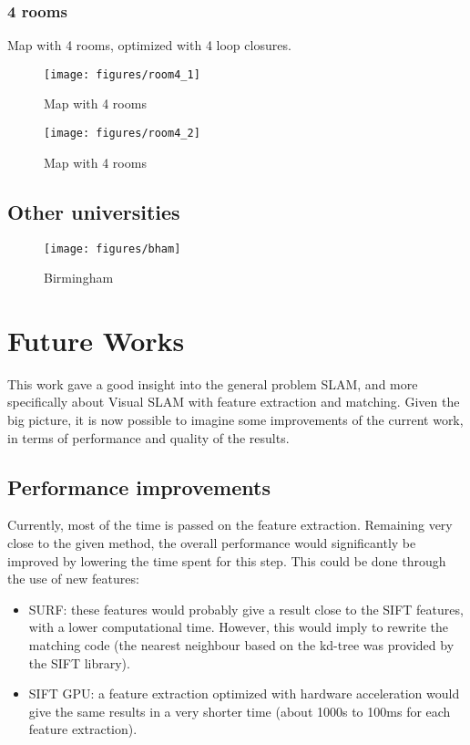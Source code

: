 \clearpage

\subsection{4 rooms}
Map with 4 rooms, optimized with 4 loop closures.

\begin{figure}[h!]
\centering
\texttt{[image: figures/room4\_1]}
\caption{Map with 4 rooms}
\end{figure}

\begin{figure}[h!]
\centering
\texttt{[image: figures/room4\_2]}
\caption{Map with 4 rooms}
\end{figure}

\clearpage

\section{Other universities}

\begin{figure}[h]
\centering
\texttt{[image: figures/bham]}
\caption{Birmingham}
\end{figure}

\chapter{Future Works}

This work gave a good insight into the general problem SLAM, and more specifically about Visual SLAM with feature extraction and matching. Given the big picture, it is now possible to imagine some improvements of the current work, in terms of performance and quality of the results.

\section{Performance improvements}

Currently, most of the time is passed on the feature extraction. Remaining very close to the given method, the overall performance would significantly be improved by lowering the time spent for this step. This could be done through the use of new features:
\begin{itemize}
\item SURF: these features would probably give a result close to the SIFT features, with a lower computational time. However, this would imply to rewrite the matching code (the nearest neighbour based on the kd-tree was provided by the SIFT library).
\item SIFT GPU: a feature extraction optimized with hardware acceleration would give the same results in a very shorter time (about 1000s to 100ms for each feature extraction).
\end{itemize}

